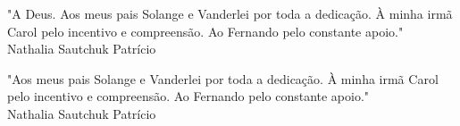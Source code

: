 
  \begin{flushright}

  \vspace*{\fill}

    "A Deus. Aos meus pais Solange e Vanderlei por toda a dedicação. À minha irmã Carol pelo incentivo e compreensão. Ao Fernando pelo constante apoio." \\ Nathalia Sautchuk Patrício

  \vspace*{\fill}

    "Aos meus pais Solange e Vanderlei por toda a dedicação. À minha irmã Carol pelo incentivo e compreensão. Ao Fernando pelo constante apoio." \\ Nathalia Sautchuk Patrício

  \vspace*{\fill}

  \end{flushright}
